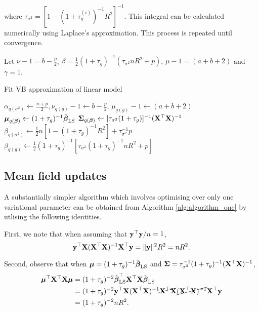 \documentclass{amsart}[12pt]
\begin{document}
\noindent where $\tau_{\sigma^2} = [1 - (1 + \tau_g^{(i)})^{-1} R^2]^{-1}$. This integral can be calculated
numerically using Laplace's approximation. This process is repeated until convergence.

Let $\nu - 1 = b - \frac{p}{2}$, 
$\beta = \frac{1}{2} (1 + \tau_g)^{-1} (\tau_{\sigma^2} n R^2 + p)$, 
$\mu - 1 = (a + b + 2)$ and $\gamma = 1$. 

\begin{algorithm}
	\caption{Fit VB approximation of linear model}
	\label{alg:algorithm_one}
	\begin{algorithmic}
		\REQUIRE $\alpha_{q(\sigma^2)} \leftarrow \frac{n + p}{2}, \nu_{q(g)} - 1 \leftarrow b - \frac{p}{2}$, $\mu_{q(g)} - 1 \leftarrow (a + b + 2)$
		\STATE ${\boldsymbol \mu}_{q({\boldsymbol \beta})} \leftarrow (1 + \tau_g)^{-1} \hat{{\boldsymbol \beta}}_{\text{LS}}$
		\STATE ${\boldsymbol \Sigma}_{q({\boldsymbol \beta})} \leftarrow [\tau_{\sigma^2} (1 + \tau_g)]^{-1} ({\bf X}^\top {\bf X})^{-1}$
		\STATE $\beta_{q(\sigma^2)} \leftarrow  \frac{1}{2} {n[1 - (1 + \tau_g)^{-1} R^2] + \tau_{\sigma^2}^{-1} p}$
		\STATE $\beta_{q(g)} \leftarrow \frac{1}{2} (1 + \tau_g)^{-1} [\tau_{\sigma^2} (1 + \tau_g)^{-1} n R^2 + p]$
		\ENDWHILE
	\end{algorithmic}
\end{algorithm}

\subsection{Mean field updates}
\label{sec:mean_field_updates}

A substantially simpler algorithm  which involves optimising over only one variational parameter can be
obtained from Algorithm \ref{alg:algorithm_one} by utlising the following identities.

First, we note that when assuming that ${\bf y}^\top {\bf y} / n = 1$,
\[{\bf y}^\top {\bf X} ({\bf X}^\top {\bf X})^{-1} {\bf X}^\top {\bf y} =\|{\bf y}\|^2 R^2 = n R^2.\]

Second, observe that when ${\boldsymbol \mu} = (1 + \tau_g)^{-1} \hat{{\boldsymbol \beta}}_{\text{LS}}$ and ${\boldsymbol \Sigma} = \tau_{\sigma^2}^{-1} (1 + \tau_g)^{-1} ({\bf X}^\top {\bf X})^{-1}$,
\begin{align*}
	{\boldsymbol\mu}^\top {\bf X}^\top {\bf X} {\boldsymbol\mu} & = (1 + \tau_g)^{-2} \hat{{\boldsymbol \beta}}_{\text{LS}}^\top {\bf X}^\top {\bf X} \hat{{\boldsymbol \beta}}_{\text{LS}}                                                        \\
	                            & = (1 + \tau_g)^{-2} {\bf y}^\top {\bf X} ({\bf X}^\top {\bf X})^{-1} \cancel{{\bf X}^\top {\bf X}} \cancel{({\bf X}^\top {\bf X})^{-1}} {\bf X}^\top {\bf y} \\
	                            & = (1 + \tau_g)^{-2} n R^2.                                                                                           
\end{align*}
\end{document}

